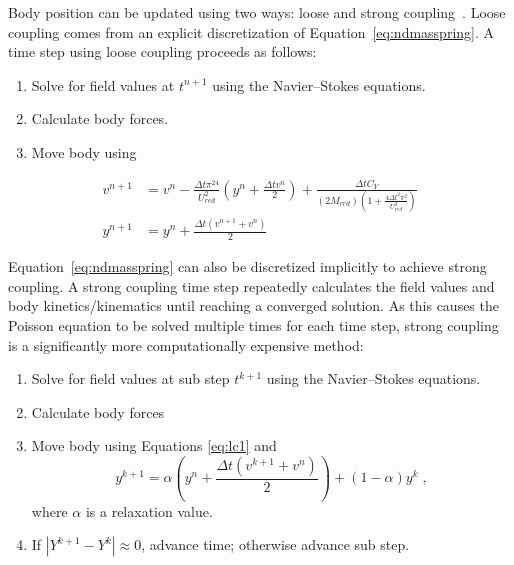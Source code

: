 \documentclass[preprint,12pt]{elsarticle}
\begin{document}
Body position can be updated using two ways: loose and strong coupling~\cite{Sotiropoulos:2014gv}.
Loose coupling comes from an explicit discretization of Equation~\eqref{eq:ndmasspring}.
A time step using loose coupling proceeds as follows:
\begin{enumerate}
    \item Solve for field values at $t^{n+1}$ using the Navier--Stokes equations.
    \item Calculate body forces.
    \item Move body using
\end{enumerate}
\begin{align}
v^{n+1} &= v^n-\frac{\Delta t\pi^24}{U_{red}^2}\left(y^n+\frac{\Delta tv^n}{2}\right) + \frac{\Delta tC_Y}{\left(2M_{red}\right)\left(1+\frac{4\Delta t^2\pi^2}{U_{red}^2}\right)} \label{eq:lc1} \\
y^{n+1} &= y^n +\frac{\Delta t\left(v^{n+1}+v^n\right)}{2}\; \label{eq:lc2}
\end{align}

Equation~\eqref{eq:ndmasspring} can also be discretized implicitly to achieve strong coupling.
A strong coupling time step repeatedly calculates the field values and body
kinetics/kinematics until reaching a converged solution.
As this causes the Poisson equation to be solved multiple times for each time step,
strong coupling is a significantly more computationally expensive method:
\begin{enumerate}
    \item Solve for field values at sub step $t^{k+1}$ using the Navier--Stokes equations.
    \item Calculate body forces
    \item Move body using Equations \eqref{eq:lc1} and
    \begin{equation}
        y^{k+1} = \alpha \left(y^n+\frac{\Delta t\left(v^{k+1}+v^n\right)}{2}\right) +\left(1-\alpha\right)y^k \;,
        \label{eq:sc}
    \end{equation}
    where $\alpha$ is a relaxation value.
    \item If $|Y^{k+1}-Y^k| \approx 0$, advance time; otherwise advance sub step.
\end{enumerate}
\end{document}
